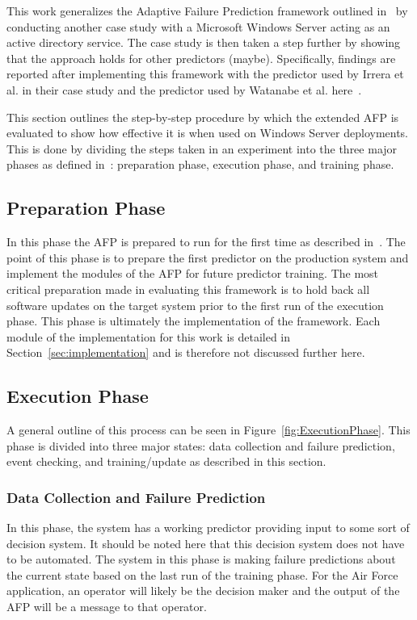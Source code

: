 This work generalizes the Adaptive Failure Prediction framework outlined
in~\cite{irrera2015} by conducting another case study with a Microsoft Windows
Server acting as an active directory service.  The case study is then taken a
step further by showing that the approach holds for other predictors (maybe).
Specifically, findings are reported after implementing this framework with
the predictor used by Irrera et al. in their case study and the predictor used
by Watanabe et al. here~\cite{watanabe2014}.

This section outlines the step-by-step procedure by which the extended AFP is
evaluated to show how effective it is when used on Windows Server deployments.
This is done by dividing the steps taken in an experiment into the three major
phases as defined in~\cite{irrera2015}: preparation phase, execution phase, and
training phase.

\subsection{Preparation Phase}
In this phase the AFP is prepared to run for the first time as described
in~\cite{irrera2015}.  The point of this phase is to prepare the first
predictor on the production system and implement the modules of the AFP for
future predictor training.  The most critical preparation made in evaluating
this framework is to hold back all software updates on the target system prior
to the first run of the execution phase.  This phase is ultimately the
implementation of the framework.  Each module of the implementation for this
work is detailed in Section~\ref{sec:implementation} and is therefore not
discussed further here.  

\subsection{Execution Phase}
A general outline of this process can be seen in
Figure~\ref{fig:ExecutionPhase}.  This phase is divided into three major
states: data collection and failure prediction, event checking, and
training/update as described in this section.

\figExecutionPhase

\subsubsection{Data Collection and Failure Prediction}
In this phase, the system has a working predictor providing input to some sort
of decision system.  It should be noted here that this decision system does not
have to be automated.  The system in this phase is making failure predictions
about the current state based on the last run of the training phase.  For the
Air Force application, an operator will likely be the decision maker and the
output of the AFP will be a message to that operator.  

